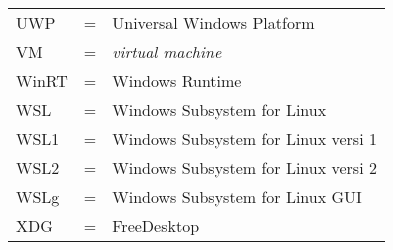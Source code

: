 \begin{tabular}{llp{3in}}
    UWP & \hspace{1.5cm} = & Universal Windows Platform\\
    VM & \hspace{1.5cm} = & \textit{virtual machine}\\
    WinRT & \hspace{1.5cm} = & Windows Runtime\\
    WSL & \hspace{1.5cm} = & Windows Subsystem for Linux\\
    WSL1 & \hspace{1.5cm} = & Windows Subsystem for Linux versi 1\\
    WSL2 & \hspace{1.5cm} = & Windows Subsystem for Linux versi 2\\
    WSLg & \hspace{1.5cm} = & Windows Subsystem for Linux GUI\\
    XDG & \hspace{1.5cm} = & FreeDesktop
\end{tabular}
